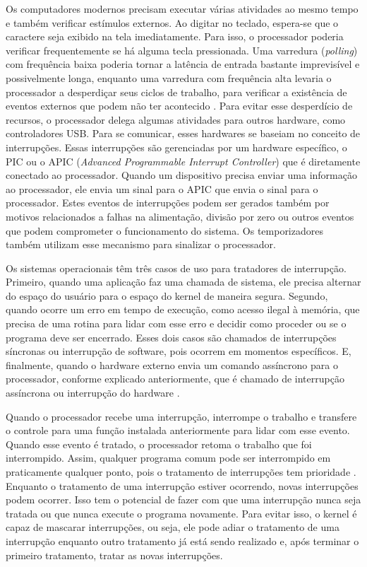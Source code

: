 Os computadores modernos precisam executar várias atividades ao mesmo tempo e também verificar estímulos externos. Ao digitar no teclado, espera-se que o caractere seja exibido na tela imediatamente. Para isso, o processador poderia verificar frequentemente se há alguma tecla pressionada. Uma varredura (\textit{polling}) com frequência baixa poderia tornar a latência de entrada bastante imprevisível e possivelmente longa, enquanto uma varredura com frequência alta levaria o processador a desperdiçar seus ciclos de trabalho, para verificar a existência de eventos externos que podem não ter acontecido \cite{Rothberg2015}. Para evitar esse desperdício de recursos, o processador delega algumas atividades para outros hardware, como controladores USB. Para se comunicar, esses hardwares se baseiam no conceito de interrupções. Essas interrupções são gerenciadas por um hardware específico, o PIC ou o APIC (\textit{Advanced Programmable Interrupt Controller}) que é diretamente conectado ao processador. Quando um dispositivo precisa enviar uma informação ao processador, ele envia um sinal para o APIC que envia o sinal para o processador. Estes eventos de interrupções podem ser gerados também por motivos relacionados a falhas na alimentação, divisão por zero ou outros eventos que podem comprometer o funcionamento do sistema. Os temporizadores também utilizam esse mecanismo para sinalizar o processador.

Os sistemas operacionais têm três casos de uso para tratadores de interrupção. Primeiro, quando uma aplicação faz uma chamada de sistema, ele precisa alternar do espaço do usuário para o espaço do kernel de maneira segura. Segundo, quando ocorre um erro em tempo de execução, como acesso ilegal à memória, que precisa de uma rotina para lidar com esse erro e decidir como proceder ou se o programa deve ser encerrado. Esses dois casos são chamados de interrupções síncronas ou interrupção de software, pois ocorrem em momentos específicos. E, finalmente, quando o hardware externo envia um comando assíncrono para o processador, conforme explicado anteriormente, que é chamado de interrupção assíncrona ou interrupção do hardware \cite{LinuxInterrupts}.

Quando o processador recebe uma interrupção, interrompe o trabalho e transfere o controle para uma função instalada anteriormente para lidar com esse evento. Quando esse evento é tratado, o processador retoma o trabalho que foi interrompido. Assim, qualquer programa comum pode ser interrompido em praticamente qualquer ponto, pois o tratamento de interrupções tem prioridade \cite{LinuxDeviceDrivers}. Enquanto o tratamento de uma interrupção estiver ocorrendo, novas interrupções podem ocorrer. Isso tem o potencial de fazer com que uma interrupção nunca seja tratada ou que nunca execute o programa novamente. Para evitar isso, o kernel é capaz de mascarar interrupções, ou seja, ele pode adiar o tratamento de uma interrupção enquanto outro tratamento já está sendo realizado e, após terminar o primeiro tratamento, tratar as novas interrupções.

